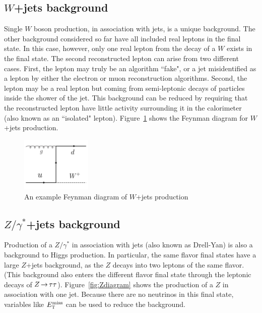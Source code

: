 \subsection{$W$+jets background}

Single $W$ boson production, in association with jets, is a unique background. The other background considered so far have all included real leptons in the final state. In this case, however, only one real lepton from the decay of a $W$ exists in the final state. The second reconstructed lepton can arise from two different cases. First, the lepton may truly be an algorithm ``fake", or a jet misidentified as a lepton by either the electron or muon reconstruction algorithms. Second, the lepton may be a real lepton but coming from semi-leptonic decays of particles inside the shower of the jet. This background can be reduced by requiring that the reconstructed lepton have little activity surrounding it in the calorimeter (also known as an ``isolated" lepton). Figure~\ref{fig:Wdiagram} shows the Feynman diagram for $W$+jets production. 


\begin{figure}[h!]
  \centering
  \captionsetup{justification=centering}

  \includegraphics[width=0.3\textwidth]{figures/Feyn_W}
  \caption{An example Feynman diagram of $W$+jets production}
  \label{fig:Wdiagram}
\end{figure}

\subsection{$Z/\gamma^{*}$+jets background}

Production of a $Z/\gamma^{*}$  in association with jets (also known as Drell-Yan) is also a background to Higgs production. In particular, the same flavor final states have a large $Z$+jets background, as the $Z$ decays into two leptons of the same flavor. (This background also enters the different flavor final state through the leptonic decays of $Z\,{\rightarrow}\,\tau\tau$). Figure~\ref{fig:Zdiagram} shows the production of a $Z$ in association with one jet. Because there are no neutrinos in this final state, variables like $E_{\textrm{\footnotesize\sc t}}^{\rm miss}$ can be used to reduce the background. 

